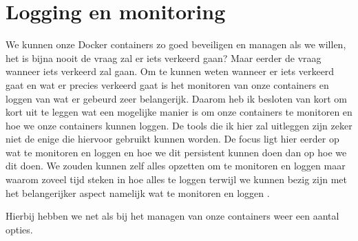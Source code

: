 \chapter{Logging en monitoring}

We kunnen onze Docker containers zo goed beveiligen en managen als we willen, het is bijna nooit de vraag zal er iets verkeerd gaan? Maar eerder de vraag wanneer iets verkeerd zal gaan. Om te kunnen weten wanneer er iets verkeerd gaat en wat er precies verkeerd gaat is het monitoren van onze containers en loggen van wat er gebeurd zeer belangerijk. Daarom heb ik besloten van kort om kort uit te leggen wat een mogelijke manier is om onze containers te monitoren en hoe we onze containers kunnen loggen. De tools die ik hier zal uitleggen zijn zeker niet de enige die hiervoor gebruikt kunnen worden. De focus ligt hier eerder op wat te monitoren en loggen en hoe we dit persistent kunnen doen dan op hoe we dit doen. We zouden kunnen zelf alles opzetten om te monitoren en loggen maar waarom zoveel tijd steken in hoe alles te loggen terwijl we kunnen bezig zijn met het belangerijker aspect namelijk wat te monitoren en loggen . 

Hierbij hebben we net als bij het managen van onze containers weer een aantal opties. 